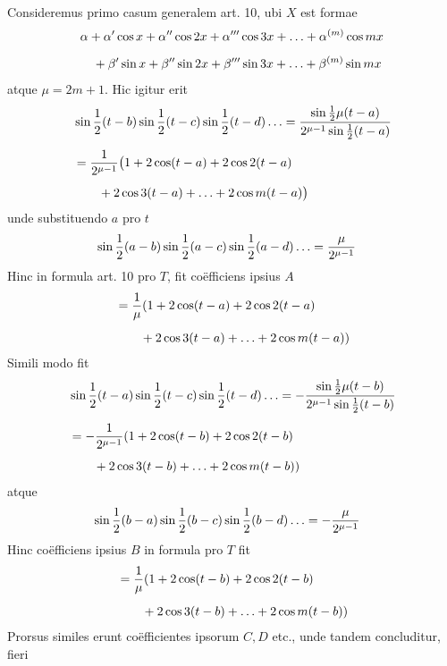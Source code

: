 Consideremus primo casum generalem art. 10, ubi \(X\) est formae
\[
\begin{aligned}
&\alpha+\alpha'\cos x+\alpha''\cos2x+\alpha'''\cos3x+\mathinner{.\,.\,.}+\alpha^{(m)}\cos mx\\[5pt]
&\quad+\beta'\sin x+\beta''\sin2x+\beta'''\sin3x+\mathinner{.\,.\,.}+\beta^{(m)}\sin mx
\end{aligned}
\]
\noindent atque \(\mu=2m+1\). Hic igitur erit
\[
\begin{aligned}
&\sin\frac12(t-b)\sin\frac12(t-c)\sin\frac12(t-d)\mathinner{.\,.\,.}=\frac{\sin\frac12\mu(t-a)}{2^{\mu-1}\sin\frac12(t-a)}\\[5pt]
&=\frac{1}{2^{\mu-1}}\bigl(1+2\cos(t-a)+2\cos2(t-a)\\[5pt]&\qquad{}+2\cos3(t-a)+\mathinner{.\,.\,.}+2\cos m(t-a)\bigr)
\end{aligned}
\]
\noindent unde substituendo \(a\) pro \(t\)
\[
\begin{aligned}
&\sin\frac12(a-b)\sin\frac12(a-c)\sin\frac12(a-d)\mathinner{.\,.\,.}=\frac{\mu}{2^{\mu-1}}
\end{aligned}
\]
Hinc in formula art. 10 pro \(T\), fit co\"efficiens ipsius \(A\)
\[
\begin{aligned}
&=\frac{1}{\mu}(1+2\cos(t-a)+2\cos2(t-a)\\[5pt]&\qquad{}+2\cos3(t-a)+\mathinner{.\,.\,.}+2\cos m(t-a))
\end{aligned}
\]
Simili modo fit
\[
\begin{aligned}
&\sin\frac12(t-a)\sin\frac12(t-c)\sin\frac12(t-d)\mathinner{.\,.\,.}
=-\frac{\sin\frac12\mu(t-b)}{2^{\mu-1}\sin\frac12(t-b)}\\[5pt]
&=-\frac{1}{2^{\mu-1}}(1+2\cos(t-b)+2\cos2(t-b)\\[5pt]&\qquad{}+2\cos3(t-b)+\mathinner{.\,.\,.}+2\cos m(t-b))
\end{aligned}
\]
atque
\[
\begin{aligned}
&\sin\frac12(b-a)\sin\frac12(b-c)\sin\frac12(b-d)\mathinner{.\,.\,.}=-\frac{\mu}{2^{\mu-1}}
\end{aligned}
\]
Hinc co\"efficiens ipsius \(B\) in formula pro \(T\) fit
\[
\begin{aligned}
&=\frac{1}{\mu}(1+2\cos(t-b)+2\cos2(t-b)\\[5pt]&\qquad{}+2\cos3(t-b)+\mathinner{.\,.\,.}+2\cos m(t-b))
\end{aligned}
\]
Prorsus similes erunt co\"efficientes ipsorum \(C,D\) etc., unde tandem concluditur,
fieri
